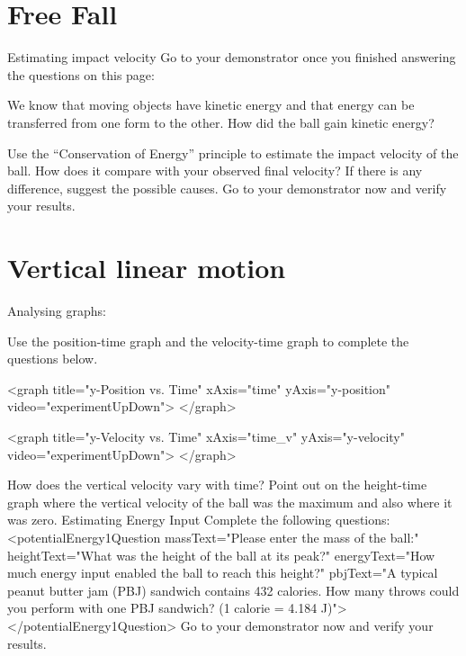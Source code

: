 \documentclass{article}
\begin{document}




\section{Free Fall}
	Estimating impact velocity
	Go to your demonstrator once you finished answering the questions on this page:

	We know that moving objects have kinetic energy and that energy can be
transferred from one form to the other. How did the ball gain kinetic energy?

	Use the “Conservation of Energy” principle to estimate the impact velocity
of the ball. How does it compare with your observed final velocity? If there is
any difference, suggest the possible causes.
	Go to your demonstrator now and verify your results.

\section{Vertical linear motion}
	Analysing graphs:

	Use the position-time graph and the velocity-time graph to complete the
questions below.

		<graph
			title="y-Position vs. Time"
			xAxis="time"
			yAxis="y-position"
			video="experimentUpDown">
		</graph>

		<graph
			title="y-Velocity vs. Time"
			xAxis="time\_v"
			yAxis="y-velocity"
			video="experimentUpDown">
		</graph>

	How does the vertical velocity vary with time?
	Point out on the height-time graph where the vertical velocity of the ball
was the maximum and also where it was zero.
	Estimating Energy Input
	Complete the following questions:
	<potentialEnergy1Question
		massText="Please enter the mass of the ball:"
		heightText="What was the height of the ball at its peak?"
		energyText="How much energy input enabled the ball to reach this height?"
		pbjText="A typical peanut butter jam (PBJ) sandwich contains 432 calories. How many throws could you perform with one PBJ sandwich? (1 calorie = 4.184 J)">
	</potentialEnergy1Question>
	Go to your demonstrator now and verify your results.
\end{document}
